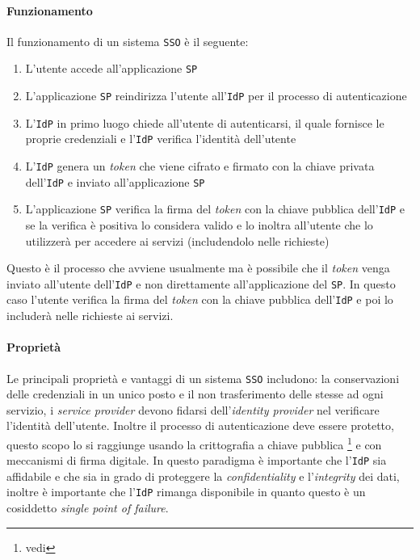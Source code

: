     \paragraph{Funzionamento} Il funzionamento di un sistema \texttt{SSO} è il seguente:
        \begin{enumerate}
            \item L'utente accede all'applicazione \texttt{SP}
            \item L'applicazione \texttt{SP} reindirizza l'utente all'\texttt{IdP} per il processo di autenticazione
            \item L'\texttt{IdP} in primo luogo chiede all'utente di autenticarsi, il quale fornisce le proprie credenziali e l'\texttt{IdP} verifica l'identità dell'utente
            \item L'\texttt{IdP} genera un \textit{token} che viene cifrato e firmato con la chiave privata dell'\texttt{IdP} e inviato all'applicazione \texttt{SP}
            \item L'applicazione \texttt{SP} verifica la firma del \textit{token} con la chiave pubblica dell'\texttt{IdP} e se la verifica è positiva lo considera valido e lo inoltra all'utente che lo utilizzerà per accedere ai servizi (includendolo nelle richieste)
        \end{enumerate}
        Questo è il processo che avviene usualmente ma è possibile che il \textit{token} venga inviato all'utente dell'\texttt{IdP} e non direttamente all'applicazione del \texttt{SP}. In questo caso l'utente verifica la firma del \textit{token} con la chiave pubblica dell'\texttt{IdP} e poi lo includerà nelle richieste ai servizi.
    \paragraph{Proprietà} Le principali proprietà e vantaggi di un sistema \texttt{SSO} includono: la conservazioni delle credenziali in un unico posto e il non trasferimento delle stesse ad ogni servizio, i \textit{service provider} devono fidarsi dell'\textit{identity provider} nel verificare l'identità dell'utente. Inoltre il processo di autenticazione deve essere protetto, questo scopo lo si raggiunge usando la crittografia a chiave pubblica \footnote{ vedi } e con meccanismi di firma digitale.
    In questo paradigma è importante che l'\texttt{IdP} sia affidabile e che sia in grado di proteggere la \textit{confidentiality} e l'\textit{integrity} dei dati, inoltre è importante che l'\texttt{IdP} rimanga disponibile in quanto questo è un cosiddetto \textit{single point of failure}.
